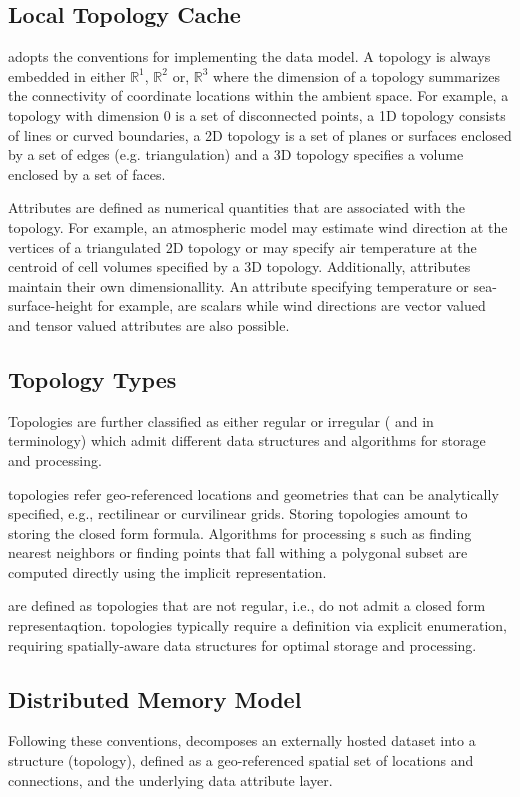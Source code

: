 \subsection{Local Topology Cache}

\sciwms{} adopts the \cfugrid{} conventions for implementing the data
model. A topology is always embedded in either $\mathbb{R}^1$,
$\mathbb{R}^2$ or, $\mathbb{R}^3$ where the dimension of a topology
summarizes the connectivity of coordinate locations within the ambient
space. For example, a topology with dimension 0 is a set of
disconnected points, a 1D topology consists of lines or curved
boundaries, a 2D topology is a set of planes or surfaces enclosed by a
set of edges (e.g. triangulation) and a 3D topology specifies a volume
enclosed by a set of faces.

Attributes are defined as numerical quantities that are associated
with the topology. For example, an atmospheric model may estimate wind
direction at the vertices of a triangulated 2D topology or may specify
air temperature at the centroid of cell volumes specified by a 3D
topology. Additionally, attributes maintain their own
dimensionallity. An attribute specifying temperature or
sea-surface-height for example, are scalars while wind directions are
vector valued and tensor valued attributes are also possible.

\subsection{Topology Types}
Topologies are further classified as either regular or irregular ({\bf
  \cgrid{}} and {\bf \ugrid} in \sciwms{} terminology) which admit
different data structures and algorithms for storage and processing.

{\bf \cgrid{}} topologies refer geo-referenced locations and geometries that can be analytically specified, e.g., rectilinear
or curvilinear grids. Storing \cgrid{} topologies amount to storing
the closed form formula. Algorithms for processing \cgrid{}s such as
finding nearest neighbors or finding points that fall withing a
polygonal subset are computed directly using the implicit \cgrid{}
representation.

{\bf \ugrid{}} are defined as topologies that are not regular, i.e.,
do not admit a closed form representaqtion. \ugrid{} topologies
typically require a definition via explicit enumeration, requiring
spatially-aware data structures for optimal storage and processing.

\subsection{Distributed Memory Model}
Following these conventions, \sciwms{} decomposes an externally hosted
dataset into a structure (topology), defined as a geo-referenced
spatial set of locations and connections, and the underlying data
attribute layer.

